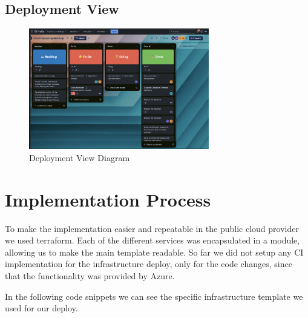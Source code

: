 \documentclass{llncs}
\begin{document}
\newpage
\subsection{Deployment View}

\begin{figure}[htbp]
    \begin{center}
        \includegraphics[width=0.7\textwidth]{../diagrams/trello_board.png}
        \vspace{0.01\textwidth}
        \caption{Deployment View Diagram}
        \label{DeploymentView} %
    \end{center}
\end{figure}


\section{Implementation Process}

To make the implementation easier and repeatable in the public cloud provider we used terraform.
Each of the different services was encapsulated in a module, allowing us to make the main template readable.
So far we did not setup any CI implementation for the infrastructure deploy, only for the code changes, since that the functionality was provided by Azure.

In the following code snippets we can see the specific infrastructure template we used for our deploy.
\end{document}
